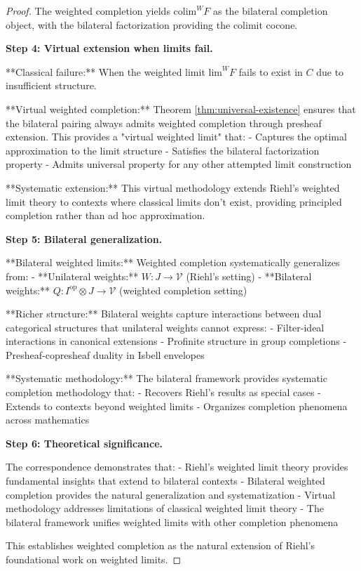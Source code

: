 \documentclass[11pt]{article}
\theoremstyle{plain}
\theoremstyle{definition}
\theoremstyle{remark}
\newcommand{\V}{\mathcal{V}}
\newcommand{\op}{\mathrm{op}}
\newcommand{\colim}{\mathrm{colim}}
\renewcommand{\lim}{\mathrm{lim}}
\begin{document}
\begin{proof}
The weighted completion yields $\colim^W F$ as the bilateral completion object, with the bilateral factorization providing the colimit cocone.

\textbf{Step 4: Virtual extension when limits fail.}

**Classical failure:** When the weighted limit $\lim^W F$ fails to exist in $C$ due to insufficient structure.

**Virtual weighted completion:** Theorem \ref{thm:universal-existence} ensures that the bilateral pairing always admits weighted completion through presheaf extension. This provides a "virtual weighted limit" that:
- Captures the optimal approximation to the limit structure
- Satisfies the bilateral factorization property
- Admits universal property for any other attempted limit construction

**Systematic extension:** This virtual methodology extends Riehl's weighted limit theory to contexts where classical limits don't exist, providing principled completion rather than ad hoc approximation.

\textbf{Step 5: Bilateral generalization.}

**Bilateral weighted limits:** Weighted completion systematically generalizes from:
- **Unilateral weights:** $W : J \to \V$ (Riehl's setting)
- **Bilateral weights:** $Q : I^{\op} \otimes J \to \V$ (weighted completion setting)

**Richer structure:** Bilateral weights capture interactions between dual categorical structures that unilateral weights cannot express:
- Filter-ideal interactions in canonical extensions
- Profinite structure in group completions  
- Presheaf-copresheaf duality in Isbell envelopes

**Systematic methodology:** The bilateral framework provides systematic completion methodology that:
- Recovers Riehl's results as special cases
- Extends to contexts beyond weighted limits
- Organizes completion phenomena across mathematics

\textbf{Step 6: Theoretical significance.}

The correspondence demonstrates that:
- Riehl's weighted limit theory provides fundamental insights that extend to bilateral contexts
- Bilateral weighted completion provides the natural generalization and systematization
- Virtual methodology addresses limitations of classical weighted limit theory
- The bilateral framework unifies weighted limits with other completion phenomena

This establishes weighted completion as the natural extension of Riehl's foundational work on weighted limits.
\end{proof}
\end{document}
